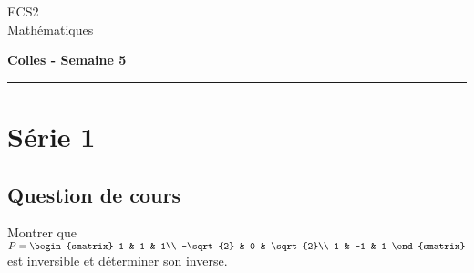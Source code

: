 \documentclass[11pt]{article}%
\begin{document}
\begin{flushleft}
ECS2 \\
Mathématiques
\end{flushleft}

\begin{center}
\textbf{\Large{Colles - Semaine 5}}
\end{center}

\hrule

\vspace*{0,2cm}

\section*{Série 1}
\subsection*{Question de cours}
Montrer que $P=
\begin{smatrix}
 1 & 1 & 1\\
 -\sqrt{2} & 0 & \sqrt{2}\\
 1 & -1 & 1
\end{smatrix}$ est inversible et déterminer son inverse.
\end{document}
